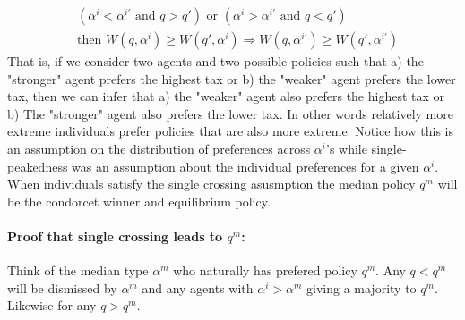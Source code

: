 \begin{equation}\label{eq: singlecrossing}
  \begin{split}
&  (\alpha^i < \alpha^{i'} \text{ and } q > q') \text{ or } (\alpha^i > \alpha^{i'} \text{ and } q<q') \\ 
&  \text{then } W(q, \alpha^i) \geq W(q', \alpha^i) \Rightarrow 
  W(q, \alpha^{i'}) \geq W(q', \alpha^{i'}) 
  \end{split}
\end{equation}
That is, if we consider two agents and two possible policies such that a) the "stronger" agent prefers the highest tax or b) the "weaker" agent prefers the lower tax, then we can infer that a) the "weaker" agent also prefers the highest tax or b) The "stronger" agent also prefers the lower tax. In other words relatively more extreme individuals prefer policies that are also more extreme. Notice how this is an assumption on the distribution of preferences across $\alpha^i$'s while single-peakedness was an assumption about the individual preferences for a given $\alpha^i$. When individuals satisfy the single crossing asusmption the median policy $q^m$ will be the condorcet winner and equilibrium policy. 

\paragraph{Proof that single crossing leads to $q^m$:} Think of the median type $\alpha^m$ who naturally has prefered policy $q^m$. Any $q<q^m$ will be dismissed by $\alpha^m$ and any agents with $\alpha^i > \alpha^m$ giving a majority to $q^m$. Likewise for any $q>q^m$.    

